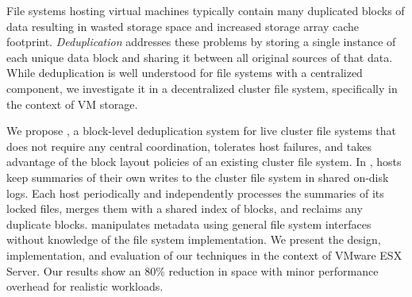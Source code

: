 
File systems hosting virtual machines typically contain many
duplicated blocks of data resulting in wasted storage space and
increased storage array cache footprint. \emph{Deduplication}
addresses these problems by
storing a single instance of each unique data block and sharing it
between all original sources of that data.  While deduplication is
well understood for file systems with a centralized component, we
investigate it in a
decentralized cluster file system, specifically in the context of
VM storage.


We propose \DeDe, a block-level deduplication
system for live cluster file systems that does not require any central
coordination, tolerates host
failures, and takes advantage of the block layout policies of an
existing cluster file system.
%
In \DeDe, hosts keep summaries of their own writes to the cluster file
system in shared on-disk logs. Each host periodically and
independently processes the summaries of its locked files, merges them
with a shared index of blocks, and reclaims any duplicate blocks.
\DeDe manipulates metadata using general file system
interfaces without knowledge of the file system implementation.
%
We present the design, implementation, and evaluation of our techniques
in the context of VMware ESX Server.  Our results show an 80\%
reduction in space with minor performance overhead for realistic
workloads.
